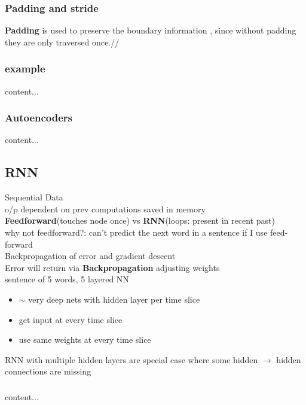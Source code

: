 \documentclass{beamer}
\begin{document}
\begin{frame}\frametitle{Padding and stride}
	\textbf{Padding }is used to preserve the boundary information , since without padding they are only traversed once.//

\end{frame}

\begin{frame}\frametitle{example}
content...
\end{frame}

\begin{frame}\frametitle{Autoencoders}
content...
\end{frame}










\subsection{RNN}


\begin{frame}
	Sequential Data\\
	o/p dependent on prev computations saved in memory\\
	\textbf{Feedforward}(touches node once) vs \textbf{RNN}(loops: present in recent past)\\
	why not feedforward?: can't predict the next word in a sentence if I use feed-forward\\
	Backpropagation of error and gradient descent\\
	Error will return via \textbf{Backpropagation} adjusting weights\\
	sentence of 5 words, 5 layered NN\\
	\begin{itemize}
		\item $\sim$ very deep nets with hidden layer per time slice
		\item get input at every time slice
		\item use same weights at every time slice
	\end{itemize}

RNN with multiple hidden layers are special case where some hidden $\rightarrow$ hidden connections are missing

\end{frame}

\begin{frame}\frametitle{}
	content...
\end{frame}
\end{document}
